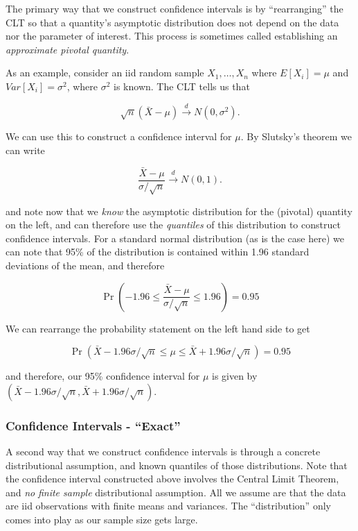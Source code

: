 \documentclass[
  letterpaper,
  DIV=11,
  numbers=noendperiod]{scrreprt}
\begin{document}
The primary way that we construct confidence intervals is by
``rearranging'' the CLT so that a quantity's asymptotic distribution
does not depend on the data nor the parameter of interest. This process
is sometimes called establishing an \emph{approximate pivotal quantity}.

As an example, consider an iid random sample \(X_1, \dots, X_n\) where
\(E[X_i] = \mu\) and \(Var[X_i] = \sigma^2\), where \(\sigma^2\) is
known. The CLT tells us that

\[
\sqrt{n}(\bar{X} - \mu) \overset{d}{\to} N(0, \sigma^2).
\]

We can use this to construct a confidence interval for \(\mu\). By
Slutsky's theorem we can write

\[
\frac{\bar{X} - \mu}{\sigma/\sqrt{n}} \overset{d}{\to} N(0, 1).
\]

and note now that we \emph{know} the asymptotic distribution for the
(pivotal) quantity on the left, and can therefore use the
\emph{quantiles} of this distribution to construct confidence intervals.
For a standard normal distribution (as is the case here) we can note
that 95\% of the distribution is contained within 1.96 standard
deviations of the mean, and therefore

\[
\Pr\left(-1.96 \leq \frac{\bar{X} - \mu}{\sigma/\sqrt{n}} \leq 1.96\right) = 0.95
\]

We can rearrange the probability statement on the left hand side to get

\[
\Pr\left(\bar{X}-1.96 \sigma/\sqrt{n} \leq \mu \leq \bar{X} + 1.96\sigma/\sqrt{n}\right) = 0.95
\]

and therefore, our 95\% confidence interval for \(\mu\) is given by
\(\left( \bar{X}-1.96 \sigma/\sqrt{n}, \bar{X}+1.96 \sigma/\sqrt{n} \right)\).

\subsubsection*{Confidence Intervals -
``Exact''}\label{confidence-intervals---exact}

A second way that we construct confidence intervals is through a
concrete distributional assumption, and known quantiles of those
distributions. Note that the confidence interval constructed above
involves the Central Limit Theorem, and \emph{no} \emph{finite sample}
distributional assumption. All we assume are that the data are iid
observations with finite means and variances. The ``distribution'' only
comes into play as our sample size gets large.
\end{document}
